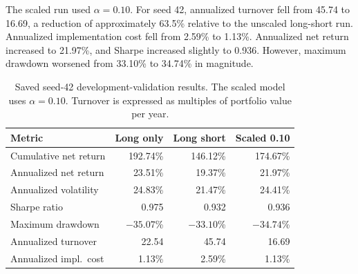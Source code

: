 \documentclass[11pt,letterpaper]{article}
\begin{document}
The scaled run used $\alpha=0.10$. For seed 42, annualized turnover fell
from 45.74 to 16.69, a reduction of approximately 63.5\% relative to the
unscaled long-short run. Annualized implementation cost fell from 2.59\%
to 1.13\%. Annualized net return increased to 21.97\%, and Sharpe increased
slightly to 0.936. However, maximum drawdown worsened from 33.10\% to
34.74\% in magnitude.

\begin{table}[htbp]
\centering
\small
\setlength{\tabcolsep}{4pt}
\begin{tabular}{@{}lrrr@{}}
\toprule
Metric & Long only & Long short & Scaled 0.10 \\
\midrule
Cumulative net return & 192.74\% & 146.12\% & 174.67\% \\
Annualized net return & 23.51\% & 19.37\% & 21.97\% \\
Annualized volatility & 24.83\% & 21.47\% & 24.41\% \\
Sharpe ratio & 0.975 & 0.932 & 0.936 \\
Maximum drawdown & $-35.07$\% & $-33.10$\% & $-34.74$\% \\
Annualized turnover & 22.54 & 45.74 & 16.69 \\
Annualized impl.\ cost & 1.13\% & 2.59\% & 1.13\% \\
\bottomrule
\end{tabular}
\caption{Saved seed-42 development-validation results. The scaled model uses
$\alpha=0.10$. Turnover is expressed as multiples of portfolio value per year.}
\end{table}
\end{document}

